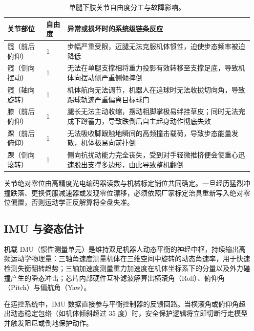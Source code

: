 \begin{table}[H]
\centering
\small
\begin{tabularx}{\textwidth}{p{2.6cm} p{1.6cm} X}
\toprule
\textbf{关节部位} & \textbf{自由度} & \textbf{异常或损坏时的系统级链条反应} \\
\midrule
髋（前后俯仰） & 1 & 步幅严重受限，迈腿无法克服机体惯性，迫使步态频率被迫降低 \\
\addlinespace
髋（侧向摆动） & 1 & 无法在单腿支撑相将重力投影有效转移至支撑足底，导致机体向摆动侧严重侧倾摔倒 \\
\addlinespace
髋（轴向旋转） & 1 & 机体航向无法调节，机器人在追球时无法收拢切向角，导致踢球轨迹严重偏离目标球门 \\
\addlinespace
膝（前后俯仰） & 1 & 腿长无法主动收缩，摆动相脚掌极易绊挂草皮；同时无法完成下蹲蓄力，导致跌倒后自主起身动作彻底失效 \\
\addlinespace
踝（前后俯仰） & 1 & 无法吸收脚跟触地瞬间的高频撞击载荷，导致步态能量发散，机体极易向前扑倒 \\
\addlinespace
踝（侧向滚转） & 1 & 侧向抗扰动能力完全丧失，受到对手轻微推挤便会使重心迅速脱出支撑多边形，由此导致整机翻倒 \\
\bottomrule
\end{tabularx}
\caption{单腿下肢关节自由度分工与故障影响。}
\end{table}

\begin{noticebox}[关节零位校准]
关节绝对零位由高精度光电编码器读数与机械标定销位共同确定。一旦经历猛烈冲撞跌落、更换伺服减速器或发现零位漂移，必须依照厂家标定治具重新写入绝对零位偏置，否则运动学正反解算将全盘失准。
\end{noticebox}

\subsection{IMU 与姿态估计}

机载 IMU（惯性测量单元）是维持双足机器人动态平衡的神经中枢，持续输出高频运动学物理量：三轴角速度测量机体在三维空间中旋转的动态角速率，用于快速检测失衡翻转趋势；三轴加速度测量重力加速度在机体坐标系下的分量以及外力碰撞产生的瞬态冲击；芯片内部硬件互补滤波解算出横滚角（Roll）、俯仰角（Pitch）与偏航角（Yaw）。

在运控系统中，IMU 数据直接参与平衡控制器的反馈回路。当横滚角或俯仰角超出动态稳定包络（如机体倾斜超过 35 度）时，安全保护逻辑将立即切断行走模型并触发阻尼或倒地保护动作。

